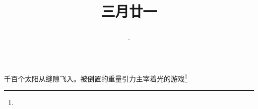 \title{\date[d=29,m=4,y=2024][year:cn-y,年,month:cn,day:cn,日,·,weekday]·三月廿一 }
千百个太阳从缝隙飞入。被倒置的重量引力主宰着光的游戏\footnote{ }

